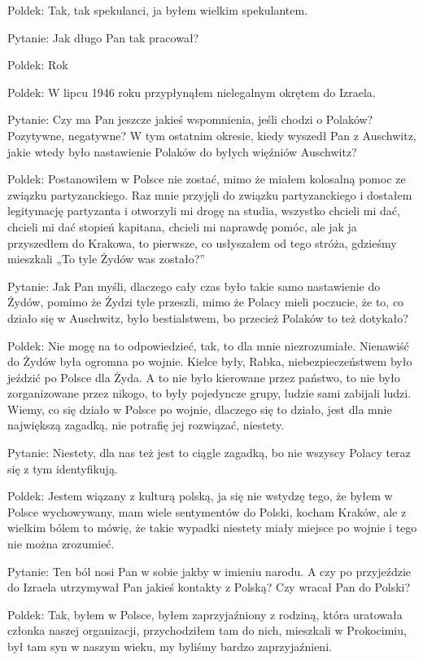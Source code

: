 Poldek: Tak, tak spekulanci, ja byłem wielkim spekulantem.  

Pytanie: Jak długo Pan tak pracował? 

Poldek: Rok 

Poldek: W lipcu 1946 roku przypłynąłem nielegalnym okrętem do Izraela.  

Pytanie: Czy ma Pan jeszcze jakieś wspomnienia, jeśli chodzi o Polaków? Pozytywne, negatywne? W tym ostatnim okresie, kiedy wyszedł Pan z Auschwitz, jakie wtedy było nastawienie Polaków do byłych więźniów Auschwitz? 

Poldek: Postanowiłem w Polsce nie zostać, mimo że miałem kolosalną pomoc ze związku partyzanckiego. Raz mnie przyjęli do związku partyzanckiego i dostałem legitymację partyzanta i otworzyli mi drogę na studia, wszystko chcieli mi dać, chcieli mi dać stopień kapitana, chcieli mi naprawdę pomóc, ale jak ja przyszedłem do Krakowa, to pierwsze, co usłyszałem od tego stróża, gdzieśmy mieszkali „To tyle Żydów was zostało?” 

Pytanie: Jak Pan myśli, dlaczego cały czas było takie samo nastawienie do Żydów, pomimo że Żydzi tyle przeszli, mimo że Polacy mieli poczucie, że to, co działo się w Auschwitz, było bestialstwem, bo przecież Polaków to też dotykało?  

Poldek: Nie mogę na to odpowiedzieć, tak, to dla mnie niezrozumiałe. Nienawiść do Żydów była ogromna po wojnie. Kielce były, Rabka, niebezpieczeństwem było jeździć po Polsce dla Żyda. A to nie było kierowane przez państwo, to nie było zorganizowane przez nikogo, to były pojedyncze grupy, ludzie sami zabijali ludzi. Wiemy, co się działo w Polsce po wojnie, dlaczego się to działo, jest dla mnie największą zagadką, nie potrafię jej rozwiązać, niestety. 

Pytanie: Niestety, dla nas też jest to ciągle zagadką, bo nie wszyscy Polacy teraz się z tym identyfikują. 

Poldek: Jestem wiązany z kulturą polską, ja się nie wstydzę tego, że byłem w Polsce wychowywany, mam wiele sentymentów do Polski, kocham Kraków, ale z wielkim bólem to mówię, że takie wypadki niestety miały miejsce po wojnie i tego nie można zrozumieć. 

Pytanie: Ten ból nosi Pan w sobie jakby w imieniu narodu. A czy po przyjeździe do Izraela utrzymywał Pan jakieś kontakty z Polską? Czy wracał Pan do Polski?  

Poldek: Tak, byłem w Polsce, byłem zaprzyjaźniony z rodziną, która uratowała członka naszej organizacji, przychodziłem tam do nich, mieszkali w Prokocimiu, był tam syn w naszym wieku, my byliśmy bardzo zaprzyjaźnieni. 

